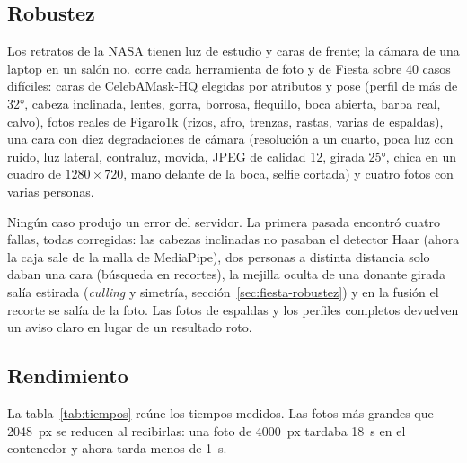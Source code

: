 \subsection{Robustez}
\label{sec:robustez}

Los retratos de la NASA tienen luz de estudio y caras de frente; la cámara de una laptop en un salón no.  corre cada herramienta de foto y de Fiesta sobre 40 casos difíciles: caras de CelebAMask-HQ elegidas por atributos y pose (perfil de más de 32°, cabeza inclinada, lentes, gorra, borrosa, flequillo, boca abierta, barba real, calvo), fotos reales de Figaro1k (rizos, afro, trenzas, rastas, varias de espaldas), una cara con diez degradaciones de cámara (resolución a un cuarto, poca luz con ruido, luz lateral, contraluz, movida, JPEG de calidad 12, girada 25°, chica en un cuadro de $1280\times720$, mano delante de la boca, selfie cortada) y cuatro fotos con varias personas.

Ningún caso produjo un error del servidor. La primera pasada encontró cuatro fallas, todas corregidas: las cabezas inclinadas no pasaban el detector Haar (ahora la caja sale de la malla de MediaPipe), dos personas a distinta distancia solo daban una cara (búsqueda en recortes), la mejilla oculta de una donante girada salía estirada (\emph{culling} y simetría, sección~\ref{sec:fiesta-robustez}) y en la fusión el recorte se salía de la foto. Las fotos de espaldas y los perfiles completos devuelven un aviso claro en lugar de un resultado roto.

\subsection{Rendimiento}

La tabla~\ref{tab:tiempos} reúne los tiempos medidos. Las fotos más grandes que 2048~px se reducen al recibirlas: una foto de 4000~px tardaba 18~s en el contenedor y ahora tarda menos de 1~s.


